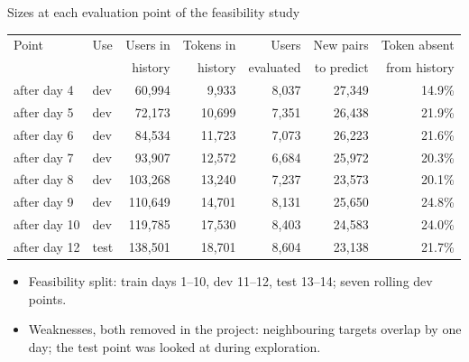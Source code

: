 \documentclass[aspectratio=169,10pt]{beamer}
\newcommand{\toindex}{\hfill\hyperlink{index}{\beamerreturnbutton{index}}}
\begin{document}
\begin{frame}[label=points]{Sizes at each evaluation point of the feasibility study \toindex}
  \small
  \centering
  \begin{tabular}{@{}llrrrrr@{}}
    \toprule
    Point & Use & Users in & Tokens in & Users & New pairs & Token absent \\
          &     & history  & history   & evaluated & to predict & from history \\
    \midrule
    after day 4 & dev & 60{,}994 & 9{,}933 & 8{,}037 & 27{,}349 & 14.9\% \\
    after day 5 & dev & 72{,}173 & 10{,}699 & 7{,}351 & 26{,}438 & 21.9\% \\
    after day 6 & dev & 84{,}534 & 11{,}723 & 7{,}073 & 26{,}223 & 21.6\% \\
    after day 7 & dev & 93{,}907 & 12{,}572 & 6{,}684 & 25{,}972 & 20.3\% \\
    after day 8 & dev & 103{,}268 & 13{,}240 & 7{,}237 & 23{,}573 & 20.1\% \\
    after day 9 & dev & 110{,}649 & 14{,}701 & 8{,}131 & 25{,}650 & 24.8\% \\
    after day 10 & dev & 119{,}785 & 17{,}530 & 8{,}403 & 24{,}583 & 24.0\% \\
    after day 12 & test & 138{,}501 & 18{,}701 & 8{,}604 & 23{,}138 & 21.7\% \\
    \bottomrule
  \end{tabular}
  \par\medskip
  \raggedright\small
  \begin{itemize}
    \item Feasibility split: train days 1--10, dev 11--12, test 13--14; seven rolling dev points.
    \item Weaknesses, both removed in the project: neighbouring targets overlap by one day; the test point was looked at during exploration.
  \end{itemize}
\end{frame}
\end{document}
